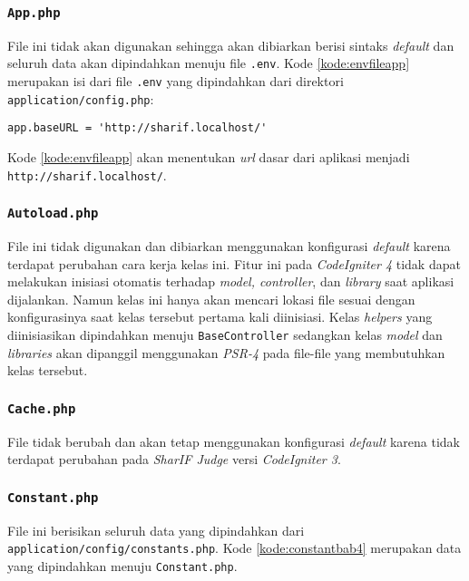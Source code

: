 \subsubsection{\texttt{App.php}}
File ini tidak akan digunakan sehingga akan dibiarkan berisi sintaks \textit{default} dan seluruh data akan dipindahkan menuju file \texttt{.env}. Kode \ref{kode:envfileapp} merupakan isi dari file \texttt{.env} yang dipindahkan dari direktori \texttt{application/config.php}:

\begin{lstlisting}[caption= Kode \texttt{application/config/config.php} yang dipindahkan menuju \texttt{.env}, label=kode:envfileapp]
	app.baseURL = 'http://sharif.localhost/'
\end{lstlisting}

Kode \ref{kode:envfileapp} akan menentukan \textit{url} dasar dari aplikasi menjadi \texttt{http://sharif.localhost/}.

\subsubsection{\texttt{Autoload.php}}
File ini tidak digunakan dan dibiarkan menggunakan konfigurasi \textit{default} karena terdapat perubahan cara kerja kelas ini. Fitur ini pada \textit{CodeIgniter 4} tidak dapat melakukan inisiasi otomatis terhadap \textit{model, controller}, dan \textit{library} saat aplikasi dijalankan. Namun kelas ini hanya akan mencari lokasi file sesuai dengan konfigurasinya saat kelas tersebut pertama kali diinisiasi. Kelas \textit{helpers} yang diinisiasikan dipindahkan menuju \texttt{BaseController} sedangkan kelas \textit{model} dan \textit{libraries} akan dipanggil menggunakan \textit{PSR-4} pada file-file yang membutuhkan kelas tersebut.

\subsubsection{\texttt{Cache.php}}
File tidak berubah dan akan tetap menggunakan konfigurasi \textit{default} karena tidak terdapat perubahan pada \textit{SharIF Judge} versi \textit{CodeIgniter 3}.

\subsubsection{\texttt{Constant.php}}
File ini berisikan seluruh data yang dipindahkan dari \texttt{application/config/constants.php}. Kode \ref{kode:constantbab4} merupakan data yang dipindahkan menuju \texttt{Constant.php}.

